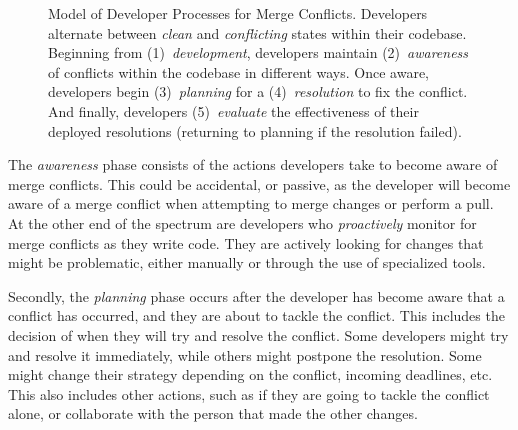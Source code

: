 
\begin{figure}[!htbp]
\centering
{}
\caption{Model of Developer Processes for Merge Conflicts. Developers alternate between \textit{clean} and \textit{conflicting} states within their codebase. Beginning from (1)~\textit{development}, developers maintain (2)~\textit{awareness} of conflicts within the codebase in different ways. Once aware, developers begin (3)~\textit{planning} for a (4)~\textit{resolution} to fix the conflict. And finally, developers (5)~\textit{evaluate} the effectiveness of their deployed resolutions (returning to planning if the resolution failed).\vspace*{-0.3\baselineskip}}
\label{model}
\end{figure}

The \emph{awareness} phase consists of the actions developers take to become aware of merge conflicts.
This could be accidental, or passive, as the developer will become aware of a merge conflict when attempting to merge changes or perform a pull.
At the other end of the spectrum are developers who \emph{proactively} monitor for merge conflicts as they write code.
They are actively looking for changes that might be problematic, either manually or through the use of specialized tools.

Secondly, the \emph{planning} phase occurs after the developer has become aware that a conflict has occurred, and they are about to tackle the conflict.
This includes the decision of when they will try and resolve the conflict.
Some developers might try and resolve it immediately, while others might postpone the resolution.
Some might change their strategy depending on the conflict, incoming deadlines, etc.
This also includes other actions, such as if they are going to tackle the conflict alone, or collaborate with the person that made the other changes.


